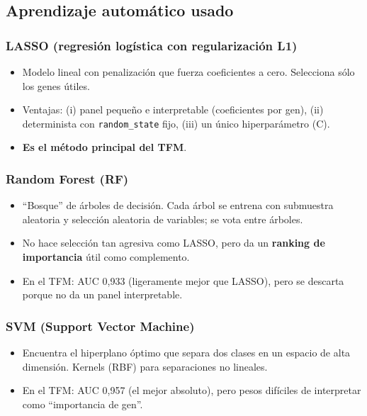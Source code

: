 \documentclass[11pt, a4paper]{article}
\begin{document}
\subsection{Aprendizaje autom\'atico usado}

\subsubsection*{LASSO (regresi\'on log\'istica con regularizaci\'on L1)}

\begin{itemize}[leftmargin=1.2em, itemsep=2pt]
  \item Modelo lineal con penalizaci\'on que fuerza coeficientes a cero. Selecciona s\'olo los genes \'utiles.
  \item Ventajas: (i) panel peque\~no e interpretable (coeficientes por gen), (ii) determinista con \texttt{random\_state} fijo, (iii) un \'unico hiperpar\'ametro (C).
  \item \textbf{Es el m\'etodo principal del TFM}.
\end{itemize}

\subsubsection*{Random Forest (RF)}

\begin{itemize}[leftmargin=1.2em, itemsep=2pt]
  \item ``Bosque'' de \'arboles de decisi\'on. Cada \'arbol se entrena con submuestra aleatoria y selecci\'on aleatoria de variables; se vota entre \'arboles.
  \item No hace selecci\'on tan agresiva como LASSO, pero da un \textbf{ranking de importancia} \'util como complemento.
  \item En el TFM: AUC 0,933 (ligeramente mejor que LASSO), pero se descarta porque no da un panel interpretable.
\end{itemize}

\subsubsection*{SVM (Support Vector Machine)}

\begin{itemize}[leftmargin=1.2em, itemsep=2pt]
  \item Encuentra el hiperplano \'optimo que separa dos clases en un espacio de alta dimensi\'on. Kernels (RBF) para separaciones no lineales.
  \item En el TFM: AUC 0,957 (el mejor absoluto), pero pesos dif\'iciles de interpretar como ``importancia de gen''.
\end{itemize}
\end{document}
